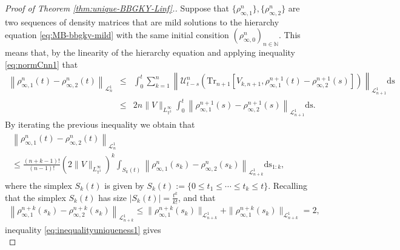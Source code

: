 \begin{proof}[Proof of Theorem \ref{thm:unique-BBGKY-Linf}.]
  Suppose that $\{\rho^n_{\infty, 1}\}, \{\rho^n_{\infty, 2}\}$ are two
  sequences of density matrices that are mild solutions to the hierarchy
  equation \eqref{eq:MB-bbgky-mild} with the same initial consition
  $(\rho^n_{\infty, 0})_{n \in \mathbb{N}}$. This means that, by the linearity
  of the hierarchy equation and applying inequality \eqref{eq:normCnn1} that
  \begin{eqnarray}
    \left\| \rho^n_{\infty, 1} (t) - \rho^n_{\infty, 2} (t) \right\|_{\mathcal{L}^1_n} &
    \leqslant & \int_0^t \sum_{k = 1}^n \left\| \mathcal{U}^n_{t - s} \left(\mathrm{Tr}_{n
    + 1} \left[V_{k, n + 1}, \rho^{n + 1}_{\infty, 1} (t) - \rho^{n + 1}_{\infty,
    2} (s)\right]\right) \right\|_{\mathcal{L}^1_{n + 1}} \mathrm{ds} \nonumber\\
    & \leqslant & 2 n \| V \|_{L_{\mathbb{T}^3}^{\infty}} \int_0^t \left\| \rho^{n
    + 1}_{\infty, 1} (s) - \rho^{n + 1}_{\infty, 2} (s) \right\|_{\mathcal{L}^1_{n +
    1}}  \mathrm{ds}.  \label{eq:inequalityuniqueness2}
  \end{eqnarray}
  By iterating the previous inequality we obtain that
  \begin{align}\label{eq:inequalityuniqueness1} 
  \begin{split}
    \left\| \rho^n_{\infty, 1} (t) - \rho^n_{\infty, 2} (t) \right\|_{\mathcal{L}^1_n} \qquad\qquad\qquad\qquad\qquad\qquad\qquad\qquad\qquad\qquad\qquad\qquad\qquad \\
    \leqslant \frac{(n + k - 1) !}{(n - 1) !} \left( 2 \| V
    \|_{L_{\mathbb{T}^3}^{\infty}} \right)^k \int_{S_k (t)} \left\| \rho^n_{\infty,
    1} (s_k) - \rho^n_{\infty, 2} (s_k) \right\|_{\mathcal{L}^1_{n + k}}
    \mathrm{ds}_{1 : k}, 
    \end{split}
  \end{align}
  where the simplex $S_k (t)$ is given by $S_k (t) := \{ 0 \leqslant t_1
  \leqslant \cdots \leqslant t_k \leqslant t \}$. Recalling that the simplex
  $S_k (t)$ has size $| S_k (t) | = \frac{t^k}{k!}$, and that
  \begin{align*}
  \left\| \rho^{n + k}_{\infty, 1} (s_k) - \rho^{n + k}_{\infty, 2} (s_k)
    \right \|_{\mathcal{L}^1_{n + k}} \leqslant \| \rho^{n + k}_{\infty, 1} (s_k)
     \|_{\mathcal{L}^1_{n + k}} + \| \rho^{n + k}_{\infty, 1} (s_k)
     \|_{\mathcal{L}^1_{n + k}} = 2,
     \end{align*}
  inequality \eqref{eq:inequalityuniqueness1} gives
  \[ 
\]
\end{proof}
